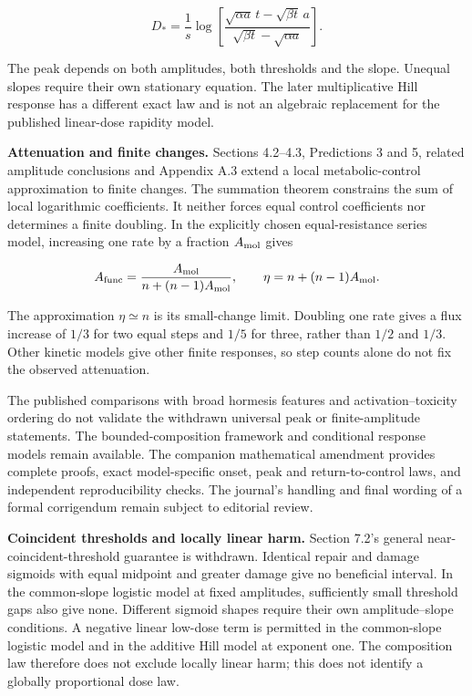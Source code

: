 \documentclass[
  11pt,
  a4paper,
]{article}
\begin{document}
\[D_*=\frac1s\log\left[
\frac{\sqrt{\alpha a}\,t-\sqrt{\beta t}\,a}
{\sqrt{\beta t}-\sqrt{\alpha a}}
\right].\]

The peak depends on both amplitudes, both thresholds and the slope. Unequal slopes require their own stationary equation. The later multiplicative Hill response has a different exact law and is not an algebraic replacement for the published linear-dose rapidity model.

\textbf{Attenuation and finite changes.} Sections 4.2--4.3, Predictions 3 and 5, related amplitude conclusions and Appendix A.3 extend a local metabolic-control approximation to finite changes. The summation theorem constrains the sum of local logarithmic coefficients. It neither forces equal control coefficients nor determines a finite doubling. In the explicitly chosen equal-resistance series model, increasing one rate by a fraction \(A_{\rm mol}\) gives

\[A_{\rm func}=\frac{A_{\rm mol}}{n+(n-1)A_{\rm mol}},\qquad
\eta=n+(n-1)A_{\rm mol}.\]

The approximation \(\eta\simeq n\) is its small-change limit. Doubling one rate gives a flux increase of \(1/3\) for two equal steps and \(1/5\) for three, rather than \(1/2\) and \(1/3\). Other kinetic models give other finite responses, so step counts alone do not fix the observed attenuation.

The published comparisons with broad hormesis features and activation--toxicity ordering do not validate the withdrawn universal peak or finite-amplitude statements. The bounded-composition framework and conditional response models remain available. The companion mathematical amendment provides complete proofs, exact model-specific onset, peak and return-to-control laws, and independent reproducibility checks. The journal's handling and final wording of a formal corrigendum remain subject to editorial review.

\textbf{Coincident thresholds and locally linear harm.} Section 7.2's general near-coincident-threshold guarantee is withdrawn. Identical repair and damage sigmoids with equal midpoint and greater damage give no beneficial interval. In the common-slope logistic model at fixed amplitudes, sufficiently small threshold gaps also give none. Different sigmoid shapes require their own amplitude--slope conditions. A negative linear low-dose term is permitted in the common-slope logistic model and in the additive Hill model at exponent one. The composition law therefore does not exclude locally linear harm; this does not identify a globally proportional dose law.
\end{document}
